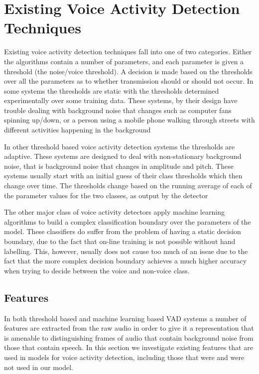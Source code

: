 \documentclass[ %
                    author={Sam Phippen},
                supervisor={Dr. Rafal Bogacz},
                     title={Real time voice activity detectors in noisy personal computing environments},
                  subtitle={},
                    degree={MEng},
                      year={2012} ]{thesis}
\begin{document}
\section{Existing Voice Activity Detection Techniques}

Existing voice activity detection techniques fall into one of two categories.
Either the algorithms contain a number of parameters, and each parameter is
given a threshold (the noise/voice threshold). A decision is made based on the
thresholds over all the parameters as to whether transmission should or should
not occur. In some systems the thresholds are static with the thresholds
determined experimentally over some training data\cite{haigh}. These systems,
by their design have trouble dealing with background noise that changes such as
computer fans spinning up/down, or a person using a mobile phone walking through
streets with different activities happening in the background

In other threshold based voice activity detection systems the thresholds are
adaptive\cite{gokhun}. These systems are designed to deal with non-stationary
background noise, that is background noise that changes in amplitude and pitch.
These systems usually start with an initial guess of their class thresholds
which then change over time. The thresholds change based on the running average
of each of the parameter values for the two classes, as output by the
detector\cite{sakhnov}

The other major class of voice activity detectors apply machine learning
algorithms to build a complex classification boundary over the parameters of
the model\cite{shin}. These classifiers do suffer from the problem of having a static
decision boundary, due to the fact that on-line training is not possible
without hand labelling. This, however, usually does not cause too much of an
issue due to the fact that the more complex decision boundary achieves a much
higher accuracy when trying to decide between the voice and non-voice class.

\subsection {Features}

In both threshold based and machine learning based VAD systems a number of
features are extracted from the raw audio in order to give it a representation
that is amenable to distinguishing frames of audio that contain background
noise from those that contain speech. In this section we investigate existing
features that are used in models for voice activity detection, including those
that were and were not used in our model.
\end{document}

